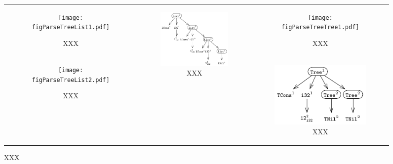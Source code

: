\begin{figure}[htpb]
\begin{tabular}{ccc}
\begin{subfigure}[b]{0.28\textwidth}
\begin{center}
\texttt{[image: figParseTreeList1.pdf]}
\end{center}
\caption{\label{fig:XXX}XXX}
\end{subfigure}%
&
\multirow[b]{2}{*}[28px]{
\begin{subfigure}[b]{0.37\textwidth}
\begin{center}
\includegraphics[scale=0.9]{figParseTreeList3.pdf}
\vspace{5px}
\end{center}
\caption{\label{fig:XXX}XXX}
\end{subfigure}%
}
&
\begin{subfigure}[b]{0.25\textwidth}
\begin{center}
\texttt{[image: figParseTreeTree1.pdf]}
\end{center}
\caption{\label{fig:XXX}XXX}
\end{subfigure}%
\\
\begin{subfigure}[b]{0.28\textwidth}
\begin{center}
\texttt{[image: figParseTreeList2.pdf]}
\end{center}
\caption{\label{fig:XXX}XXX}
\end{subfigure}%
&
&
\begin{subfigure}[b]{0.25\textwidth}
\begin{center}
\includegraphics[scale=0.9]{figParseTreeTree2.pdf}
\vspace{5px}
\end{center}
\caption{\label{fig:XXX}XXX}
\end{subfigure}%
\\
\end{tabular}
\caption{\label{fig:XXX}XXX}
\end{figure}